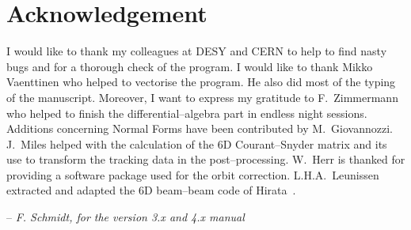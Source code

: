 \chapter*{Acknowledgement}

I would like to thank my colleagues at DESY and CERN to help to find nasty bugs and for a thorough check of the program.
I would like to thank Mikko Vaenttinen who helped to vectorise the program.
He also did most of the typing of the manuscript.
Moreover, I want to express my gratitude to F.~Zimmermann who helped to finish the differential--algebra part in endless night sessions.
Additions concerning Normal Forms have been contributed by M.~Giovannozzi.
J.~Miles helped with the calculation of the 6D Courant--Snyder matrix and its use to transform the tracking data in the post--processing.
W.~Herr is thanked for providing a software package used for the orbit correction. L.H.A.~Leunissen extracted and adapted the 6D beam--beam code of Hirata~\cite{Hirata}.

\bigskip
\hfill -- \textit{F. Schmidt, for the version 3.x and 4.x manual}